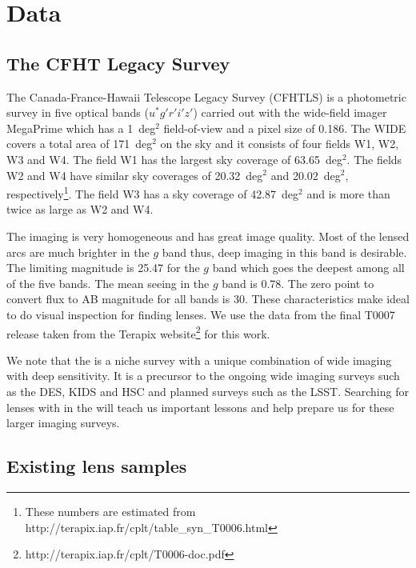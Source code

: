 \documentclass[useAMS,usenatbib,a4paper]{mn2e}
\begin{document}

\section{Data}
\label{sec:data}
\subsection{The CFHT Legacy Survey}
\label{sec:data:cfhtls}

The Canada-France-Hawaii Telescope Legacy Survey (CFHTLS) is a
photometric survey in five optical bands ($u^*g'r'i'z'$) carried out
with the wide-field imager MegaPrime which has a 1~deg$^2$ field-of-view
and a pixel size of 0.186\arcsec. The \cfhtls \textsc{WIDE} covers a total area
of 171~deg$^2$ on the sky and it consists of four fields W1, W2, W3 and
W4. The field W1 has the largest sky coverage of 63.65~deg$^2$. The
fields W2 and W4 have similar sky coverages of 20.32~deg$^2$ and
20.02~deg$^2$, respectively\footnote{These numbers are estimated from http://terapix.iap.fr/cplt/table\_syn\_T0006.html}.
The field W3 has a sky coverage of 42.87~deg$^2$ and is more than twice
as large as W2 and W4. 

The \cfhtls imaging is very homogeneous and has great image quality. Most of
the lensed arcs are much brighter in the $g$ band thus, deep imaging in
this band is desirable. The limiting magnitude is 25.47 for the $g$ band
which goes the deepest among all of the five bands. The mean seeing in
the $g$ band is 0.78\arcsec. The zero point to convert flux to AB
magnitude for all bands is 30. These characteristics make \cfhtls ideal
to do visual inspection for finding lenses.  We use the data from the
final T0007 release taken from the Terapix
website\footnote{{http://terapix.iap.fr/cplt/T0006-doc.pdf}}
for this work.

We note that the \cfhtls is a niche survey with a unique combination of
wide imaging with deep sensitivity. It is a precursor to the ongoing
wide imaging surveys such as the DES, KIDS and HSC and planned surveys
such as the LSST. Searching for lenses with \sw in the \cfhtls will
teach us important lessons and help prepare us for these larger imaging
surveys.




\subsection{Existing \cfhtls lens samples}
\label{sec:data:kls}
\end{document}
